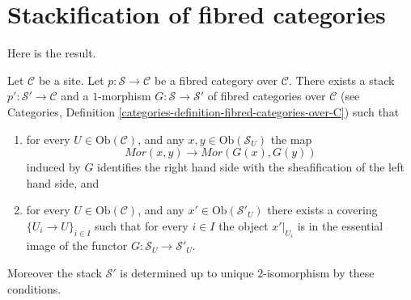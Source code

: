 \section{Stackification of fibred categories}
\label{section-stackify}

\noindent
Here is the result.

\begin{lemma}
\label{lemma-stackify}
Let $\mathcal{C}$ be a site.
Let $p : \mathcal{S} \to \mathcal{C}$ be a fibred category over $\mathcal{C}$.
There exists a stack $p' : \mathcal{S}' \to \mathcal{C}$ and a
$1$-morphism $G : \mathcal{S} \to \mathcal{S}'$
of fibred categories over $\mathcal{C}$ (see
Categories, Definition \ref{categories-definition-fibred-categories-over-C})
such that
\begin{enumerate}
\item for every $U \in \text{Ob}(\mathcal{C})$, and any
$x, y \in \text{Ob}(\mathcal{S}_U)$ the map
$$
\mathit{Mor}(x, y) \longrightarrow \mathit{Mor}(G(x), G(y))
$$
induced by $G$ identifies the right hand side with the sheafification
of the left hand side, and
\item for every $U \in \text{Ob}(\mathcal{C})$, and any
$x' \in \text{Ob}(\mathcal{S}'_U)$ there exists a covering
$\{U_i \to U\}_{i \in I}$ such that for every $i \in I$ the
object $x'|_{U_i}$ is in the essential image of the
functor $G : \mathcal{S}_U \to \mathcal{S}'_U$.
\end{enumerate}
Moreover the stack $\mathcal{S}'$ is determined up to unique
$2$-isomorphism by these conditions.
\end{lemma}

